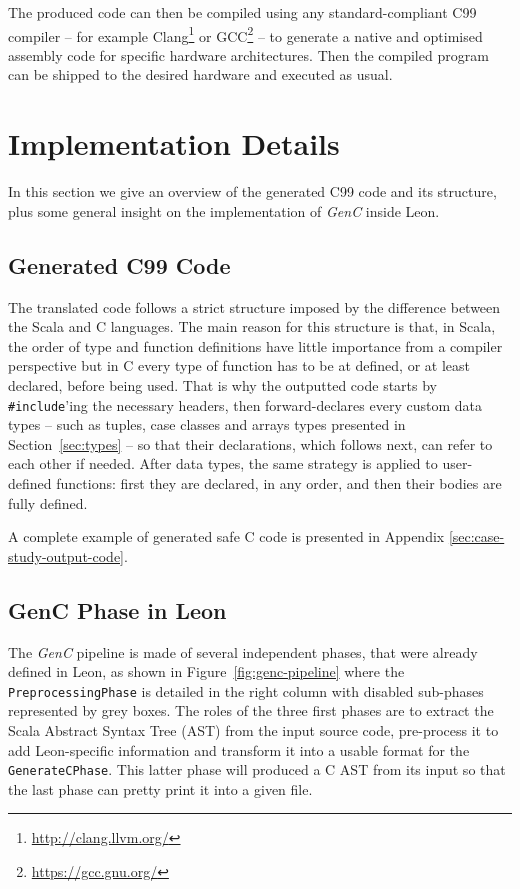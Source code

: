 \documentclass{article}
\newcommand{\inlineC}[1]{\lstinline[language=C99]|#1|}
\newcommand{\inlineScala}[1]{\lstinline[language=MyScala]|#1|}
\newcommand{\GenC}{\emph{GenC}\xspace}
\begin{document}
The produced code can then be compiled using any standard-compliant C99 compiler
-- for example Clang\footnote{\url{http://clang.llvm.org/}} or
GCC\footnote{\url{https://gcc.gnu.org/}} -- to generate a native and optimised
assembly code for specific hardware architectures.  Then the compiled program
can be shipped to the desired hardware and executed as usual.



\section{Implementation Details}

In this section we give an overview of the generated C99 code and its structure,
plus some general insight on the implementation of \GenC inside Leon.



\subsection{Generated C99 Code}

The translated code follows a strict structure imposed by the difference between
the Scala and C languages. The main reason for this structure is that, in Scala,
the order of type and function definitions have little importance from a
compiler perspective but in C every type of function has to be at defined, or at
least declared, before being used. That is why the outputted code starts by
\inlineC{#include}'ing the necessary headers, then forward-declares every custom
data types -- such as tuples, case classes and arrays types presented in
Section~\ref{sec:types} -- so that their declarations, which follows next, can
refer to each other if needed. After data types, the same strategy is applied to
user-defined functions: first they are declared, in any order, and then their
bodies are fully defined.

A complete example of generated safe C code is presented in Appendix
\ref{sec:case-study-output-code}.



\subsection{GenC Phase in Leon}

The \GenC pipeline is made of several independent phases, that were already
defined in Leon, as shown in Figure~\ref{fig:genc-pipeline} where the
\inlineScala{PreprocessingPhase} is detailed in the right column with disabled
sub-phases represented by grey boxes. The roles of the three first phases are to
extract the Scala Abstract Syntax Tree (AST) from the input source code,
pre-process it to add Leon-specific information and transform it into a usable
format for the \inlineScala{GenerateCPhase}. This latter phase will produced a C
AST from its input so that the last phase can pretty print it into a given file.
\end{document}
